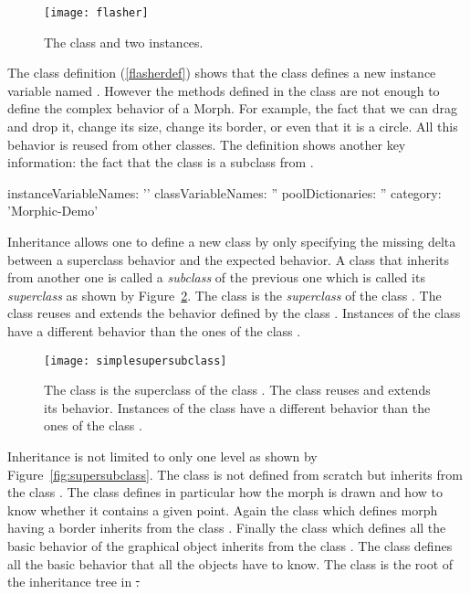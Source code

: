 \begin{figure}[!h]
\begin{center}
\texttt{[image: flasher]}
\caption{The class  and two instances.\label{fig:flasher}}
\end{center}
\end{figure}


The class definition (\ref{flasherdef}) shows that the class defines a new instance variable named . However the methods defined in the class  are not enough to define the complex behavior of a Morph. For example, the fact that we can drag and drop it, change its size, change its border, or even that it is a circle. All this behavior is reused from other classes. The definition shows another key information: the fact that the class  is a subclass from .

\begin{classdef}\label{flasherdef}
   instanceVariableNames: ''
   classVariableNames: ''
   poolDictionaries: ''
   category: 'Morphic-Demo'
\end{classdef}


Inheritance allows one to define a new class by only specifying the missing delta between a superclass behavior and the expected behavior. A class that inherits from another one is called a \emph{subclass} of the previous one which is called its \emph{superclass} as shown by Figure~\ref{fig:simplesupersubclass}.  The class  is the \emph{superclass} of the class . The class  reuses and extends the behavior defined by the class . Instances of the class  have a different behavior than the ones of the class .


\begin{figure}[h]
\begin{center}
\texttt{[image: simplesupersubclass]}
\caption{The class  is the superclass of the class . The class  reuses and extends its behavior. Instances of the class  have a different behavior than the ones of the class . \label{fig:simplesupersubclass}}
\end{center}
\end{figure}


Inheritance is not limited to only one level as shown by Figure~\ref{fig:supersubclass}. The class  is not defined from scratch but inherits from the class . The class  defines in particular how the morph is drawn and how to know whether it contains a given point. Again the class  which defines morph having a border inherits from the class . Finally the class  which defines all the basic behavior of the graphical object inherits from the class . The class  defines all the basic behavior that all the objects have to know. The class  is the root of the inheritance tree in \st. 


